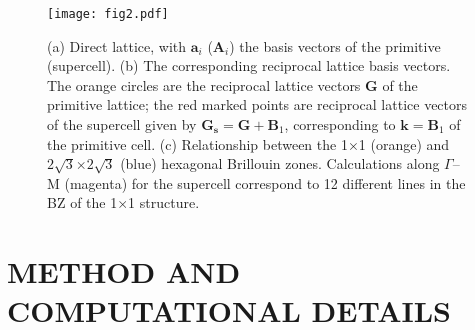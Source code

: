 \documentclass[aps,prb,showpacs,twocolumn,reprint,superscriptaddress]{revtex4-1}
\begin{document}
\begin{figure}
\texttt{[image: fig2.pdf]}
\caption{(a) Direct lattice, with $\mathbf{a}_i$ ($\mathbf{A}_i$) the basis vectors of the primitive
(supercell).
(b) The corresponding reciprocal lattice basis vectors. The orange circles are the reciprocal lattice vectors
$\mathbf{G}$ of the primitive lattice; the red marked points are reciprocal lattice vectors of the supercell
given by $\mathbf{G_s} = \mathbf{G} + \mathbf{B}_1$, corresponding to $\mathbf{k}=\mathbf{B}_1$ of the
primitive cell.
(c) Relationship between the 1$\times$1 (orange) and $2\sqrt{3}$$\times$$2\sqrt{3}$ (blue) hexagonal Brillouin zones.
Calculations along $\Gamma$--M (magenta) for the supercell correspond to 12 different lines in the BZ of the
1$\times$1 structure.
}
\label{fig2}
\end{figure}

\section{METHOD AND COMPUTATIONAL DETAILS}
%
\end{document}
